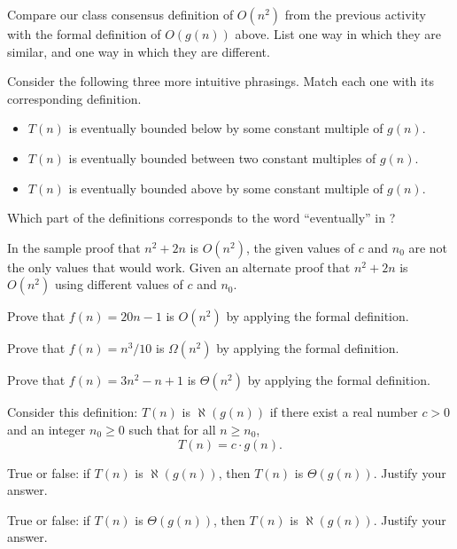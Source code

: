 \documentclass{tufte-handout}
\begin{document}
\begin{questions}
\item Compare our class consensus definition of $O(n^2)$ from the
  previous activity with the formal definition of $O(g(n))$ above.
  List one way in which they are similar, and one way in which they
  are different. \vspace{0.5in}
\item \label{q:phrasing} Consider the following three more intuitive
  phrasings.  Match each one with its corresponding definition.
    \begin{itemize}
    \item $T(n)$ is eventually bounded below by some constant multiple
      of $g(n)$.
    \item $T(n)$ is eventually bounded between two constant multiples
      of $g(n)$.
    \item $T(n)$ is eventually bounded above by some constant multiple
      of $g(n)$.
    \end{itemize}

  \item Which part of the definitions corresponds to the word
    ``eventually'' in ?

  \item \label{q:alt-proof} In the sample proof that $n^2 + 2n$ is $O(n^2)$, the given
    values of $c$ and $n_0$ are not the only values that would work.
    Given an alternate proof that $n^2 + 2n$ is $O(n^2)$ using
    different values of $c$ and $n_0$.
  \item Prove that $f(n) = 20n - 1$ is $O(n^2)$ by applying the formal
    definition.
    \vspace{0.5in}
  \item Prove that $f(n) = n^3/10$ is $\Omega(n^2)$ by applying the
    formal definition.
    \vspace{0.5in}
  \item \label{q:last-formal-proof} Prove that $f(n) = 3n^2 - n + 1$ is
    $\Theta(n^2)$ by applying the formal definition.  \vspace{0.5in}

  \item Consider this definition: $T(n)$ is $\aleph(g(n))$ if there
    exist a real number $c > 0$ and an integer $n_0 \geq 0$ such that
    for all $n \geq n_0$, \[ T(n) = c \cdot g(n). \]
    \begin{subquestions}
    \item True or false: if $T(n)$ is $\aleph(g(n))$, then $T(n)$ is
      $\Theta(g(n))$.  Justify your answer.
    \item True or false: if $T(n)$ is $\Theta(g(n))$, then $T(n)$ is
      $\aleph(g(n))$.  Justify your answer.
    \end{subquestions}
\end{questions}
\end{document}
